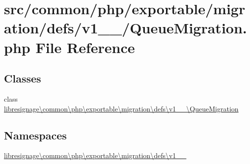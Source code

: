\hypertarget{v1__1__0_2QueueMigration_8php}{}\section{src/common/php/exportable/migration/defs/v1\+\_\+\_/\+Queue\+Migration.php File Reference}
\label{v1__1__0_2QueueMigration_8php}
\subsection*{Classes}
\begin{DoxyCompactItemize}
\item 
class \hyperlink{classlibresignage_1_1common_1_1php_1_1exportable_1_1migration_1_1defs_1_1v1__1__0_1_1QueueMigration}{libresignage\textbackslash{}common\textbackslash{}php\textbackslash{}exportable\textbackslash{}migration\textbackslash{}defs\textbackslash{}v1\+\_\+\_\textbackslash{}\+Queue\+Migration}
\end{DoxyCompactItemize}
\subsection*{Namespaces}
\begin{DoxyCompactItemize}
\item 
 \hyperlink{namespacelibresignage_1_1common_1_1php_1_1exportable_1_1migration_1_1defs_1_1v1__1__0}{libresignage\textbackslash{}common\textbackslash{}php\textbackslash{}exportable\textbackslash{}migration\textbackslash{}defs\textbackslash{}v1\+\_\+\_}
\end{DoxyCompactItemize}
